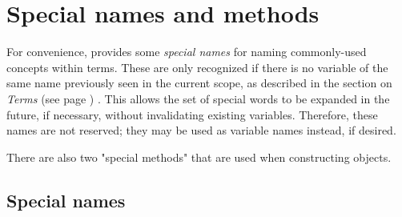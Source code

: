 \section{Special names and methods}\label{refspecial}
 
For convenience, \nr{} provides some \emph{special names} for naming
commonly-used concepts within terms.
These are only recognized if there is no variable of the same name
previously seen in the current scope, as described in the section on
 \emph{Terms} (see page \pageref{refterms}) .
This allows the set of special words to be expanded in the future, if
necessary, without invalidating existing variables.  Therefore, these
names are not reserved; they may be used as variable names instead, if
desired.
 
There are also two "special methods" that are used when
constructing objects.
\subsection{Special names}\label{specialnames}
 
